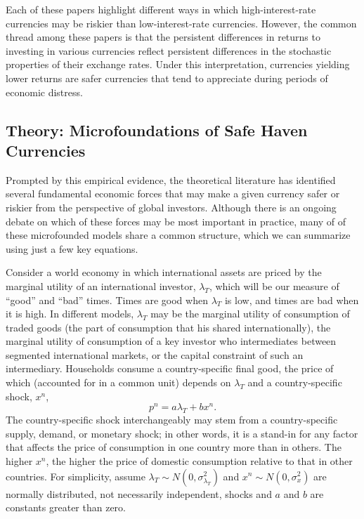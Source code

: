\documentclass{ar-1col}
\begin{document}
Each of these papers highlight different ways in which high-interest-rate currencies 
may be riskier than low-interest-rate currencies. However, the common thread among 
these papers is that the persistent differences in returns to investing in various
currencies reflect persistent differences in the stochastic properties of their 
exchange rates. Under this interpretation, currencies yielding lower returns are safer 
currencies that tend to appreciate during periods of economic distress. 


\subsection{Theory: Microfoundations of Safe Haven Currencies}

Prompted by this empirical evidence, the theoretical literature has identified several fundamental economic forces that may make a given currency safer or riskier from the perspective of global investors. Although there is an ongoing debate on which of these forces may be most important in practice, many of of these microfounded models share a common structure, which we can summarize using just a few key equations.

Consider a world economy in which international assets
are priced by the marginal utility of an international investor, $\lambda_T$, which will be our measure of ``good'' and ``bad'' times. Times are good when $\lambda_T$ is low, and times are bad when it is high. In different models, $\lambda_T$ may be the marginal utility of consumption of traded goods (the part of consumption that his shared internationally), the marginal utility of consumption of a key investor who intermediates between segmented international markets, or the capital constraint of such an intermediary. 
Households consume a country-specific final good, the price of which (accounted for in
a common unit) depends on $\lambda_T$ and a country-specific shock,
$x^n$,
\begin{equation}
  p^{n}=a\lambda _{T}+b x^{n}.  \label{eq_RF}
\end{equation}%
The country-specific shock
interchangeably may stem from a country-specific supply, demand, or monetary shock; in
other words, it is a stand-in for any factor that affects the price of
consumption in one country more than in others. The higher $x^{n}$,
the higher the price of domestic consumption relative to that in other countries. 
For simplicity, assume $\lambda _{T}\sim N(0,\sigma^2_{\lambda_{T}})$ and
$x^{n} \sim N(0,\sigma^2_x) $ are normally distributed, not
necessarily independent, shocks and $a$ and $b$ are constants greater
than zero.
\end{document}
